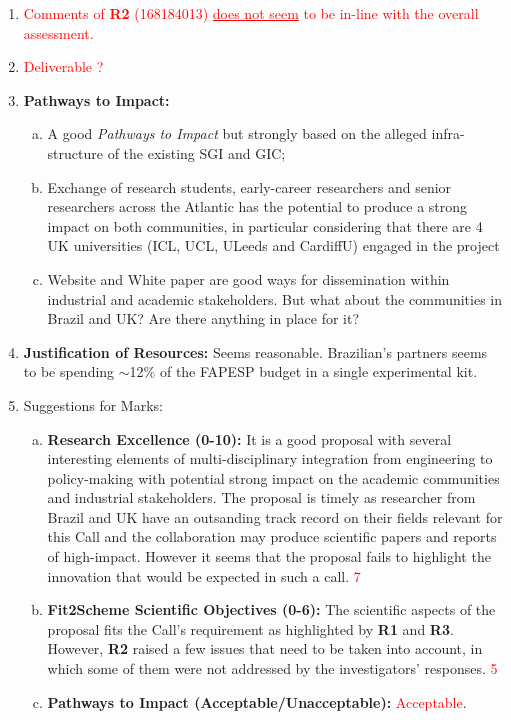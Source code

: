 \documentclass[14pt,twoside]{report}
\begin{document}
       \begin{enumerate}[1.]
          \item \textcolor{red}{Comments of {\bf R2} (168184013) \underline{does not seem} to be in-line with the overall assessment.}
%
          \item \textcolor{red}{Deliverable ?}
%
          \item {\bf Pathways to Impact:}
              \begin{enumerate}[(a)]
                 \item A good {\it Pathways to Impact} but strongly based on the alleged infra-structure of the existing SGI and GIC;
%
                 \item Exchange of research students, early-career researchers and senior researchers across the Atlantic has the potential to produce a strong impact on both communities, in particular considering that there are 4 UK universities (ICL, UCL, ULeeds and CardiffU) engaged in the project
                 \item Website and White paper are good ways for dissemination within industrial and academic stakeholders. But what about the communities in Brazil and UK? Are there anything in place for it? 
              \end{enumerate}
%
          \item {\bf Justification of Resources:} Seems reasonable. Brazilian's partners seems to be spending $\sim$12$\%$ of the FAPESP budget in a single experimental kit.
%       
          \item Suggestions for  Marks:
              \begin{enumerate}[(a)]
                 \item {\bf Research Excellence (0-10):} It is a good proposal with several interesting elements of multi-disciplinary integration from engineering to policy-making with potential strong impact on the academic communities and industrial stakeholders. The proposal is timely as researcher from Brazil and UK have an outsanding track record on their fields relevant for this Call and the collaboration may produce scientific papers and reports of high-impact. However it seems that the proposal fails to highlight the innovation that would be expected in such a call. \textcolor{red}{7}
                 \item {\bf Fit2Scheme Scientific Objectives (0-6):} The scientific aspects of the proposal fits the Call's requirement as highlighted by {\bf R1} and {\bf R3}. However, {\bf R2} raised a few issues that need to be taken into account, in which some of them were not addressed by the investigators' responses. \textcolor{red}{5}
                 \item {\bf Pathways to Impact (Acceptable/Unacceptable):} \textcolor{red}{Acceptable}.
              \end{enumerate}
%
       \end{enumerate}
\end{document}
